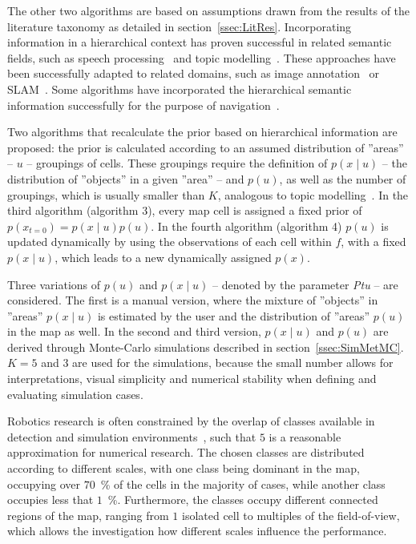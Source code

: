 \documentclass[twocolumn,letterpaper]{IEEEAerospaceCLS}  %
\begin{document}
The other two algorithms are based on assumptions drawn from the results of the literature taxonomy as detailed in section~\ref{ssec:LitRes}. Incorporating information in a hierarchical context has proven successful in related semantic fields, such as speech processing~\cite{fine_hierarchical_1998} and topic modelling~\cite{blei_latent_2003}. These approaches have been successfully adapted to related domains, such as image annotation~\cite{fei-fei_bayesian_2005,lienou_semantic_2010} or SLAM~\cite{zhang_hierarchical_2019}. Some algorithms have incorporated the hierarchical semantic information successfully for the purpose of navigation~\cite{koch_automatic_2019,chaplot_object_2020,wu_learning_2018,alirezaie_exploiting_2017}.

Two algorithms  that recalculate the prior based on hierarchical information are proposed: the prior is calculated according to an assumed distribution of ''areas'' -- $u$ -- groupings of cells. These groupings require the definition of $p(x\mid u)$ -- the distribution of ''objects'' in a given ''area'' -- and $p(u)$, as well as the number of groupings, which is usually smaller than $K$, analogous to topic modelling~\cite{blei_latent_2003}. In the third algorithm (algorithm 3), every map cell is assigned a fixed prior of $p(x_{t=0}) = p(x\mid u) p(u)$. In the fourth algorithm (algorithm 4) $p(u)$ is updated dynamically by using the observations of each cell within $f$, with a fixed $p(x\mid u)$, which leads to a new dynamically assigned $p(x)$.

Three variations of $p(u)$ and $p(x\mid u)$ -- denoted by the parameter \emph{Ptu} -- are considered. The first is a manual version, where the mixture of ''objects'' in ''areas'' $p(x\mid u)$ is estimated by the user and the distribution of ''areas'' $p(u)$ in the map as well. In the second and third version, $p(x\mid u)$ and $p(u)$ are derived through Monte-Carlo simulations described in section~\ref{ssec:SimMetMC}. $K=5$ and $3$ are used for the simulations, because the small number allows for interpretations, visual simplicity and numerical stability when defining and evaluating simulation cases.

Robotics research is often constrained by the overlap of classes available in detection and simulation environments~\cite{chaplot_object_2020}, such that $5$ is a reasonable approximation for numerical research. The chosen classes are distributed according to different scales, with one class being dominant in the map, occupying over $70$~\% of the cells in the majority of cases, while another class occupies less that $1$~\%. Furthermore, the classes occupy different connected regions of the map, ranging from $1$ isolated cell to multiples of the field-of-view, which allows the investigation how different scales influence the performance.
\end{document}
